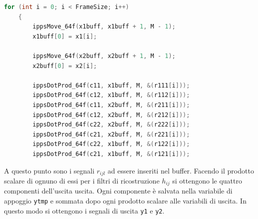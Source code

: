 \documentclass[12pt,a4paper,titlepage]{article}
\begin{document}
\begin{lstlisting}[language=cpp, label=code:rij, caption = Calcolo dei segnali intermedi, breaklines = false, captionpos = b]
	for (int i = 0; i < FrameSize; i++)
	{
		ippsMove_64f(x1buff, x1buff + 1, M - 1);
		x1buff[0] = x1[i];

		ippsMove_64f(x2buff, x2buff + 1, M - 1);
		x2buff[0] = x2[i];

		ippsDotProd_64f(c11, x1buff, M, &(r111[i]));
		ippsDotProd_64f(c12, x1buff, M, &(r112[i]));
		ippsDotProd_64f(c11, x2buff, M, &(r211[i]));
		ippsDotProd_64f(c12, x2buff, M, &(r212[i]));
		ippsDotProd_64f(c22, x2buff, M, &(r222[i]));
		ippsDotProd_64f(c21, x2buff, M, &(r221[i]));
		ippsDotProd_64f(c22, x1buff, M, &(r122[i]));
		ippsDotProd_64f(c21, x1buff, M, &(r121[i]));
\end{lstlisting}
A questo punto sono i segnali $r_{ijl}$ ad essere inseriti nel buffer. Facendo il prodotto scalare di ognuno di essi per i filtri di ricostruzione $h_{ij}$ si ottengono le quattro componenti dell'uscita uscita. Ogni componente è salvata nella variabile di appoggio \texttt{ytmp} e sommata dopo ogni prodotto scalare alle variabili di uscita. In questo modo si ottengono i segnali di uscita \texttt{y1} e \texttt{y2}.
\end{document}

